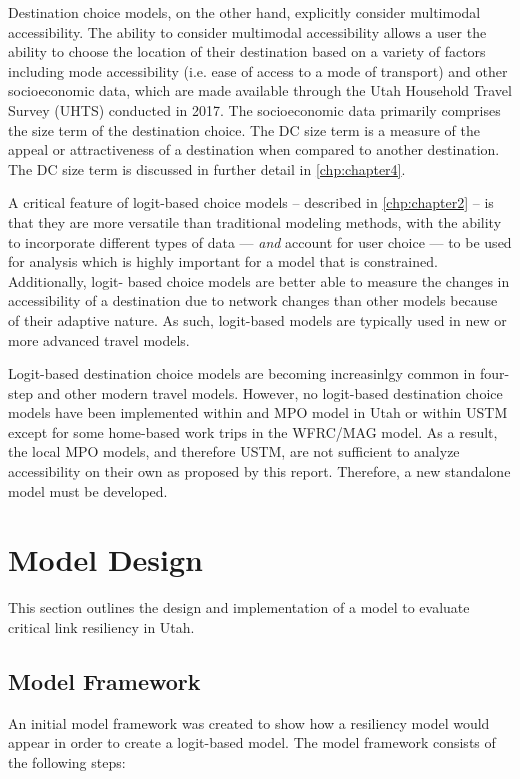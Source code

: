 Destination choice models, on the other hand, explicitly consider multimodal
accessibility. The ability to consider multimodal accessibility allows a user
the ability to choose the location of their destination based on a variety of
factors including mode accessibility (i.e. ease of access to a mode of
transport) and other socioeconomic data, which are made available through the
Utah Household Travel Survey (UHTS) conducted in 2017. The socioeconomic data
primarily comprises the size term of the destination choice. The DC size term
is a measure of the appeal or attractiveness of a destination when compared to
another destination. The DC size term is discussed in further detail in
\ref{chp:chapter4}.

A critical feature of logit-based choice models – described in
\ref{chp:chapter2} – is that they are more versatile than
traditional modeling methods, with the ability to incorporate different types
of data --- \textit{and} account for user choice --- to be used for analysis
which is highly important for a model that is constrained. Additionally, logit-
based choice models are better able to measure the changes in accessibility of
a destination due to network changes than other models because of their
adaptive nature. As such, logit-based models are typically used in new or more
advanced travel models.

Logit-based destination choice models are becoming increasinlgy common in four-
step and other modern travel models. However, no logit-based destination
choice models have been implemented within and MPO model in Utah or within
USTM except for some home-based work trips in the WFRC/MAG model. As a result,
the local MPO models, and therefore USTM, are not sufficient to analyze
accessibility on their own as proposed by this report. Therefore, a new
standalone model must be developed.

\section{Model Design} \label{Model Design}

This section outlines the design and implementation of a model to evaluate
critical link resiliency in Utah.

\subsection{Model Framework}

An initial model framework was created to show how a resiliency model would
appear in order to create a logit-based model. The model framework consists of the following steps:


